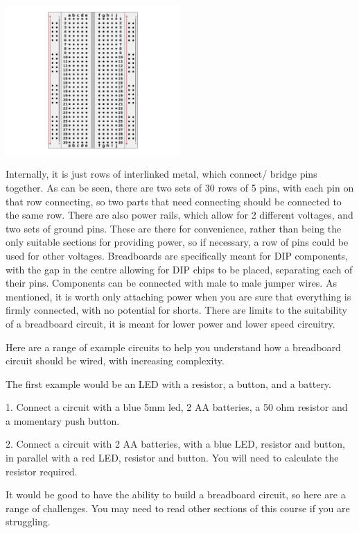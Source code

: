 \documentclass[a4paper,11pt]{report}
\newcommand{\Examples}[1] %
{
\par\noindent %
\phantomsection %
\todo[inline, color=red!30]{\textbf{#1}} %
\vspace{1em} %
}
\newcommand{\Quiz}[1] %
{
\par\noindent %
\phantomsection %
\todo[inline, color=blue!30]{\textbf{#1}} %
\vspace{1em} %
}
\begin{document}
\includegraphics[width=0.5\textwidth]{breadboard}

Internally, it is just rows of interlinked metal, which connect/ bridge pins together. As can be seen, there are two sets of 30 rows of 5 pins, with each pin on that row connecting, so two parts that need connecting should be connected to the same row. There are also power rails, which allow for 2 different voltages, and two sets of ground pins. These are there for convenience, rather than being the only suitable sections for providing power, so if necessary, a row of pins could be used for other voltages. Breadboards are specifically meant for DIP components, with the gap in the centre allowing for DIP chips to be placed, separating each of their pins. Components can be connected with male to male jumper wires. As mentioned, it is worth only attaching power when you are sure that everything is firmly connected, with no potential for shorts. There are limits to the suitability of a breadboard circuit, it is meant for lower power and lower speed circuitry.

\Examples{Examples}

Here are a range of example circuits to help you understand how a breadboard circuit should be wired, with increasing complexity.

The first example would be an LED with a resistor, a button, and a battery.

\Quiz{Challenges}

1. Connect a circuit with a blue 5mm led, 2 AA batteries, a 50 ohm resistor and a momentary push button.

2. Connect a circuit with 2 AA batteries, with a blue LED, resistor and button, in parallel with a red LED, resistor and button. You will need to calculate the resistor required.

It would be good to have the ability to build a breadboard circuit, so here are a range of challenges. You may need to read other sections of this course if you are struggling.
\end{document}
